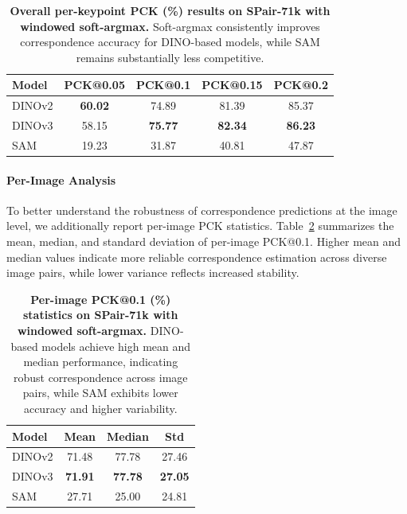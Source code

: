 \begin{table}[t]
    \centering
    \setlength{\tabcolsep}{3pt}
    \begin{tabular}{lcccc}
        \toprule
        Model & PCK@0.05 & PCK@0.1 & PCK@0.15 & PCK@0.2 \\
        \midrule
        DINOv2 & \textbf{60.02} & 74.89 & 81.39 & 85.37 \\
        DINOv3 & 58.15 & \textbf{75.77} & \textbf{82.34} & \textbf{86.23} \\
        SAM & 19.23 & 31.87 & 40.81 & 47.87 \\
        \bottomrule
    \end{tabular}
    \caption{
    \textbf{Overall per-keypoint PCK (\%) results on SPair-71k with windowed soft-argmax.}
    Soft-argmax consistently improves correspondence accuracy for DINO-based models, while SAM remains substantially less competitive.
    }
    \label{tab:softargmax_keypoint}
\end{table}



\paragraph{Per-Image Analysis}

To better understand the robustness of correspondence predictions at the image level, we additionally report per-image PCK statistics.
Table~\ref{tab:softargmax_image} summarizes the mean, median, and standard deviation of per-image PCK@0.1.
Higher mean and median values indicate more reliable correspondence estimation across diverse image pairs,
while lower variance reflects increased stability.


\begin{table}[t]
    \centering
    \setlength{\tabcolsep}{6pt}
    \begin{tabular}{lccc}
        \toprule
        Model & Mean & Median & Std \\
        \midrule
        DINOv2 & 71.48 & 77.78 & 27.46 \\
        DINOv3 & \textbf{71.91} & \textbf{77.78} & \textbf{27.05} \\
        SAM & 27.71 & 25.00 & 24.81 \\
        \bottomrule
    \end{tabular}
    \caption{
    \textbf{Per-image PCK@0.1 (\%) statistics on SPair-71k with windowed soft-argmax.}
    DINO-based models achieve high mean and median performance, indicating robust correspondence across image pairs,
    while SAM exhibits lower accuracy and higher variability.
    }
    \label{tab:softargmax_image}
\end{table}


